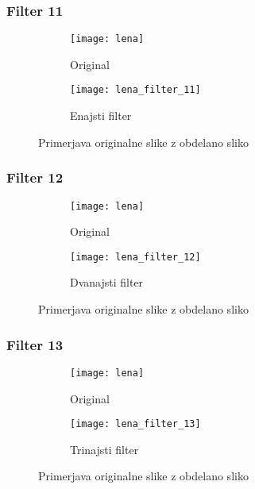 \subsubsection*{Filter 11}
\begin{figure}[h]
    \centering
    \begin{subfigure}[b]{0.4\textwidth}
        \texttt{[image: lena]}
        \caption{Original}
    \end{subfigure}
    \begin{subfigure}[b]{0.4\textwidth}
        \texttt{[image: lena\_filter\_11]}
        \caption{Enajsti filter}
    \end{subfigure}
    \caption{Primerjava originalne slike z obdelano sliko}
    \label{fig:lena_filter_11}
\end{figure}


\subsubsection*{Filter 12}
\begin{figure}[h]
    \centering
    \begin{subfigure}[b]{0.4\textwidth}
        \texttt{[image: lena]}
        \caption{Original}
    \end{subfigure}
    \begin{subfigure}[b]{0.4\textwidth}
        \texttt{[image: lena\_filter\_12]}
        \caption{Dvanajsti filter}
    \end{subfigure}
    \caption{Primerjava originalne slike z obdelano sliko}
    \label{fig:lena_filter_12}
\end{figure}


\subsubsection*{Filter 13}
\begin{figure}[h]
    \centering
    \begin{subfigure}[b]{0.4\textwidth}
        \texttt{[image: lena]}
        \caption{Original}
    \end{subfigure}
    \begin{subfigure}[b]{0.4\textwidth}
        \texttt{[image: lena\_filter\_13]}
        \caption{Trinajsti filter}
    \end{subfigure}
    \caption{Primerjava originalne slike z obdelano sliko}
    \label{fig:lena_filter_13}
\end{figure}


